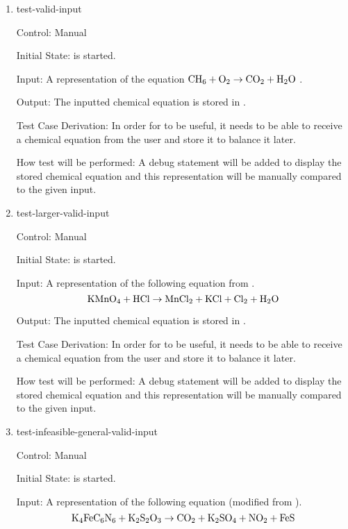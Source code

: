 \documentclass[12pt, titlepage]{article}
\begin{document}
\begin{enumerate}

  \item{test-valid-input\\}

  Control: Manual

  Initial State: \progname{} is started.

  Input: A representation of the equation
  $\ce{CH6} + \ce{O2} \rightarrow \ce{CO2} + \ce{H2O}$
  \cite{hamid_balancing_2019}.

  Output: The inputted chemical equation is stored in \progname{}.

  Test Case Derivation: In order for \progname{} to be useful, it needs to be
  able to receive a chemical equation from the user and store it to balance it
  later.

  How test will be performed: A debug statement will be added to display the
  stored chemical equation and this representation will be manually compared to
  the given input.

  \item{test-larger-valid-input\\}

  Control: Manual

  Initial State: \progname{} is started.

  Input: A representation of the following equation from
  \cite{taylor_balancing_2021}.
  $$\ce{KMnO4} + \ce{HCl} \rightarrow \ce{MnCl2} + \ce{KCl} + \ce{Cl2} + \ce{H2O}$$

  Output: The inputted chemical equation is stored in \progname{}.

  Test Case Derivation: In order for \progname{} to be useful, it needs to be
  able to receive a chemical equation from the user and store it to balance it
  later.

  How test will be performed: A debug statement will be added to display the
  stored chemical equation and this representation will be manually compared to
  the given input.

  \item{test-infeasible-general-valid-input\\}

  Control: Manual

  Initial State: \progname{} is started.

  Input: A representation of the following equation (modified from
  \cite{hamid_balancing_2019}).
  $$\ce{K4FeC6N6} + \ce{K2S2O3} \rightarrow \ce{CO2} + \ce{K2SO4} + \ce{NO2} +
    \ce{FeS}$$


\end{enumerate}
\end{document}
